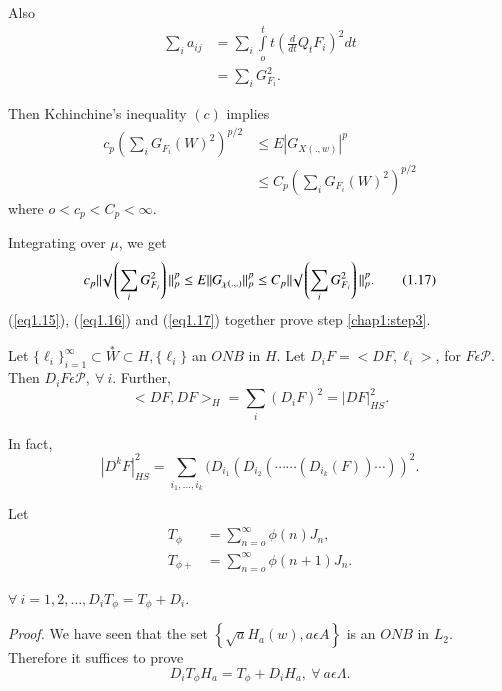 Also
\begin{align*}
  \sum _i a_{ij} & = \sum_i \int\limits ^t_o t \left(\frac{d}{dt} Q_t
  F_i\right)^2 dt \\ 
  &= \sum_i G^2_{F_i}.
\end{align*}

Then Kchinchine's inequality $(c)$ implies
\begin{align*}
  c_p \left(\sum_i G_{F_i}(W)^2\right)^{p/2} & \leq E | G_{X(., w)}|^p\\
  & \leq C_p \left(\sum_i G_{F_i}(W)^2\right)^{p/2}
\end{align*}
where $o < c_p <C_p < \infty$.

Integrating over $\mu$, we get
\begin{equation*}
  c_p || \surd \left(\sum_i G^2_{F_i}\right) ||^p_p \leq E || G_{\chi (., .)} ||
  ^p_p \leq C_p || \surd \left(\sum_i G^2_{F_i}\right)
  ||^p_p. \tag{1.17}\label{eq1.17}  
\end{equation*}
(\ref{eq1.15}), (\ref{eq1.16}) and (\ref{eq1.17}) together prove step
\ref{chap1:step3}. 

\begin{step}\label{chap1:step4}%
Let $\{ \ell_i \} ^\infty_{i=1}\subset \overset{\ast}{W} \subset H, \{
\ell_i\}$ an 
$ONB$ in $H$. Let $D_iF = < DF, \ell_i > $, for $F \epsilon 
\mathcal{P}$. Then $D_i F \epsilon  \mathcal{P}, ~\forall~ i$. Further,  
$$
< DF, DF >_H = \sum _i (D_i F)^2 = | DF |^2_{HS}.
$$\pageoriginale

In fact,
$$
| D^k F |^2_{HS}= \sum_{i_1, \ldots,i_k} (D_{i_1} (D_{i_2}( \cdots
\cdots ( D_{i_k} (F)) \cdots ))^2. 
$$
\end{step}

Let 
\begin{align*}
  T_\phi &= \sum^{\infty}_{n=o}\phi (n)J_n,\\
  T_{\phi +} &= \sum^{\infty}_{n = o}\phi (n + 1)J_n.
\end{align*}

\begin{fact}%
  $\forall~ i = 1, 2,\ldots, D_i T_\phi = T_{\phi}+D_i$.
\end{fact}

\noindent
\textit{Proof.}
We have seen that the set $\left\{ \sqrt{a} H_a (w), a \epsilon  A \right\}$ is
an $ONB$ in $L_2$. Therefore it suffices to prove 
\begin{equation*}
  D_i T_\phi H_a= T_ {\phi} + D_i H_a, ~\forall~ a \epsilon
  \Lambda. \tag*{$\Box$} 
\end{equation*}

